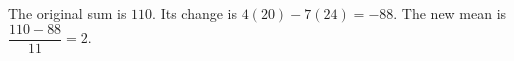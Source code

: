 The original sum is $110$. Its change is $4(20)-7(24)=-88$. The new mean is $\dfrac{110-88}{11}=\boxed{2}$.
